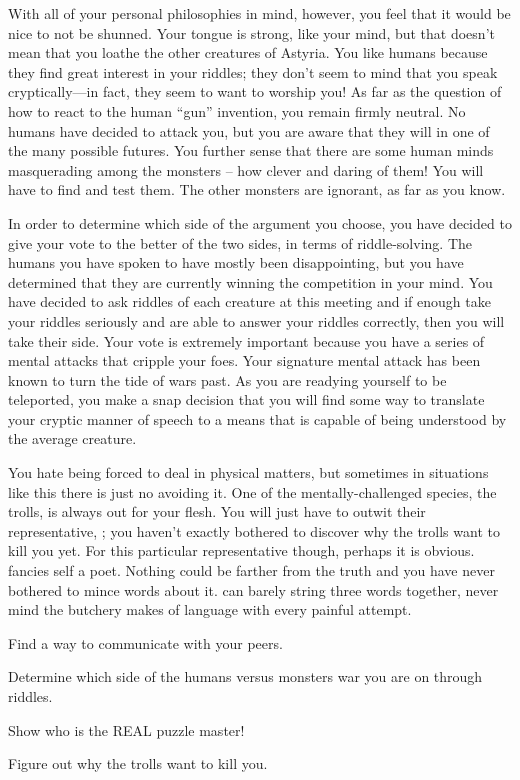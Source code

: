 \documentclass[char]{guildcamp2}
\begin{document}
With all of your personal philosophies in mind, however, you feel that it would be nice to not be shunned. Your tongue is strong, like your mind, but that doesn't mean that you loathe the other creatures of Astyria. You like humans because they find great interest in your riddles; they don't seem to mind that you speak cryptically---in fact, they seem to want to worship you! As far as the question of how to react to the human ``gun'' invention, you remain firmly neutral. No humans have decided to attack you, but you are aware that they will in one of the many possible futures. You further sense that there are some human minds masquerading among the monsters -- how clever and daring of them! You will have to find and test them. The other monsters are ignorant, as far as you know.

In order to determine which side of the argument you choose, you have decided to give your vote to the better of the two sides, in terms of riddle-solving. The humans you have spoken to have mostly been disappointing, but you have determined that they are currently winning the competition in your mind. You have decided to ask riddles of each creature at this meeting and if enough take your riddles seriously and are able to answer your riddles correctly, then you will take their side. Your vote is extremely important because you have a series of mental attacks that cripple your foes. Your signature mental attack has been known to turn the tide of wars past. As you are readying yourself to be teleported, you make a snap decision that you will find some way to translate your cryptic manner of speech to a means that is capable of being understood by the average creature. 

You hate being forced to deal in physical matters, but sometimes in situations like this there is just no avoiding it. One of the mentally-challenged species, the trolls, is always out for your flesh. You will just have to outwit their representative, \cTroll{}; you haven't exactly bothered to discover why the trolls want to kill you yet. For this particular representative though, perhaps it is obvious. \cTroll{} fancies \cTroll{\them}self a poet. Nothing could be farther from the truth and you have never bothered to mince words about it. \cTroll{\They} can barely string three words together, never mind the butchery \cTroll{\they} makes of language with every painful attempt.

\begin{itemz}[Goals]
  \item Find a way to communicate with your peers.
  \item Determine which side of the humans versus monsters war you are on through riddles.
  \item Show \cMinotaur{} who is the REAL puzzle master!
  \item Figure out why the trolls want to kill you.
\end{itemz}
\end{document}

